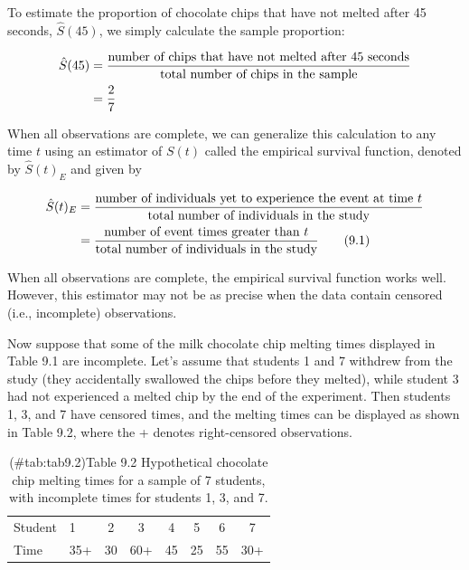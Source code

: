 \documentclass[
]{book}
\begin{document}
To estimate the proportion of chocolate chips that have not melted after 45 seconds, \(\hat S(45)\), we simply
calculate the sample proportion:

\begin{align}
\hat S(45) &= \frac{\text{number of chips that have not melted after 45 seconds}}{\text{total number of chips in the sample}} \notag \\
&= \frac{2}{7} \notag
\end{align}

When all observations are complete, we can generalize this calculation to any time \(t\) using an estimator of \(S(t)\) called the empirical survival function, denoted by \(\hat S(t)_{E}\) and given by

\begin{align}\label{9.1}
\hat S(t)_{E}
&= \frac{\text{number of individuals yet to experience the event at time }t}{\text{total number of individuals in the study}} \notag \\
&= \frac{\text{number of event times greater than }t}{\text{total number of individuals in the study}}
\tag{9.1}
\end{align}

When all observations are complete, the empirical survival function works well. However, this estimator may not be as precise when the data contain censored (i.e., incomplete) observations.

Now suppose that some of the milk chocolate chip melting times displayed in Table 9.1 are incomplete. Let's assume that students 1 and 7 withdrew from the study (they accidentally swallowed the chips before they melted), while student 3 had not experienced a melted chip by the end of the experiment. Then students 1, 3, and 7 have censored times, and the melting times can be displayed as shown in Table 9.2, where the + denotes right-censored observations.

\begin{table}[!h]
\centering
\caption{(\#tab:tab9.2)Table 9.2 Hypothetical chocolate chip melting times for a sample of 7 students, with incomplete times for students 1, 3, and 7.}
\centering
\begin{tabular}[t]{llcccccc}
\toprule
  &  &  &  &  &  &  & \\
\midrule
Student & 1 & 2 & 3 & 4 & 5 & 6 & 7\\
Time & 35+ & 30 & 60+ & 45 & 25 & 55 & 30+\\
\bottomrule
\end{tabular}
\end{table}
\end{document}
